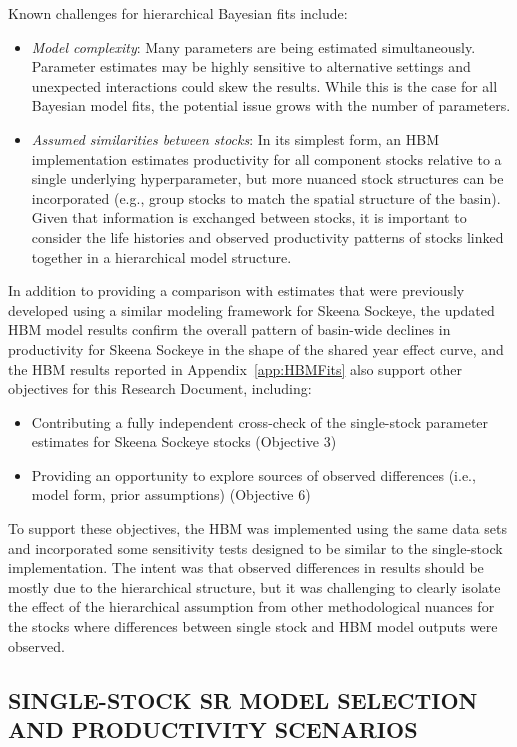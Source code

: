 \documentclass[french,11pt]{book}
\begin{document}
Known challenges for hierarchical Bayesian fits include:
\begin{itemize}

\item
  \emph{Model complexity}: Many parameters are being estimated simultaneously. Parameter estimates may be highly sensitive to alternative settings and unexpected interactions could skew the results. While this is the case for all Bayesian model fits, the potential issue grows with the number of parameters.
\item
  \emph{Assumed similarities between stocks}: In its simplest form, an HBM implementation estimates productivity for all component stocks relative to a single underlying hyperparameter, but more nuanced stock structures can be incorporated (e.g., group stocks to match the spatial structure of the basin). Given that information is exchanged between stocks, it is important to consider the life histories and observed productivity patterns of stocks linked together in a hierarchical model structure.
\end{itemize}
In addition to providing a comparison with estimates that were previously developed using a similar modeling framework for Skeena Sockeye, the updated HBM model results confirm the overall pattern of basin-wide declines in productivity for Skeena Sockeye in the shape of the shared year effect curve, and the HBM results reported in Appendix~\ref{app:HBMFits} also support other objectives for this Research Document, including:
\begin{itemize}

\item
  Contributing a fully independent cross-check of the single-stock parameter estimates for Skeena Sockeye stocks (Objective 3)
\item
  Providing an opportunity to explore sources of observed differences (i.e., model form, prior assumptions) (Objective 6)
\end{itemize}
To support these objectives, the HBM was implemented using the same data sets and incorporated some sensitivity tests designed to be similar to the single-stock implementation. The intent was that observed differences in results should be mostly due to the hierarchical structure, but it was challenging to clearly isolate the effect of the hierarchical assumption from other methodological nuances for the stocks where differences between single stock and HBM model outputs were observed.

\subsection{SINGLE-STOCK SR MODEL SELECTION AND PRODUCTIVITY SCENARIOS}\label{ModelSelection}
\end{document}
